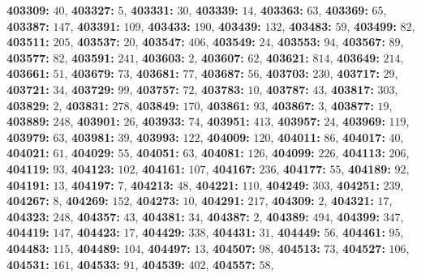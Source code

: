 \textsf{\bfseries 403309:} $40$, \textsf{\bfseries 403327:} $5$, \textsf{\bfseries 403331:} $30$, \textsf{\bfseries 403339:} $14$, \textsf{\bfseries 403363:} $63$, \textsf{\bfseries 403369:} $65$, \textsf{\bfseries 403387:} $147$, \textsf{\bfseries 403391:} $109$, \textsf{\bfseries 403433:} $190$, \textsf{\bfseries 403439:} $132$, \textsf{\bfseries 403483:} $59$, \textsf{\bfseries 403499:} $82$, \textsf{\bfseries 403511:} $205$, \textsf{\bfseries 403537:} $20$, \textsf{\bfseries 403547:} $406$, \textsf{\bfseries 403549:} $24$, \textsf{\bfseries 403553:} $94$, \textsf{\bfseries 403567:} $89$, \textsf{\bfseries 403577:} $82$, \textsf{\bfseries 403591:} $241$, \textsf{\bfseries 403603:} $2$, \textsf{\bfseries 403607:} $62$, \textsf{\bfseries 403621:} $814$, \textsf{\bfseries 403649:} $214$, \textsf{\bfseries 403661:} $51$, \textsf{\bfseries 403679:} $73$, \textsf{\bfseries 403681:} $77$, \textsf{\bfseries 403687:} $56$, \textsf{\bfseries 403703:} $230$, \textsf{\bfseries 403717:} $29$, \textsf{\bfseries 403721:} $34$, \textsf{\bfseries 403729:} $99$, \textsf{\bfseries 403757:} $72$, \textsf{\bfseries 403783:} $10$, \textsf{\bfseries 403787:} $43$, \textsf{\bfseries 403817:} $303$, \textsf{\bfseries 403829:} $2$, \textsf{\bfseries 403831:} $278$, \textsf{\bfseries 403849:} $170$, \textsf{\bfseries 403861:} $93$, \textsf{\bfseries 403867:} $3$, \textsf{\bfseries 403877:} $19$, \textsf{\bfseries 403889:} $248$, \textsf{\bfseries 403901:} $26$, \textsf{\bfseries 403933:} $74$, \textsf{\bfseries 403951:} $413$, \textsf{\bfseries 403957:} $24$, \textsf{\bfseries 403969:} $119$, \textsf{\bfseries 403979:} $63$, \textsf{\bfseries 403981:} $39$, \textsf{\bfseries 403993:} $122$, \textsf{\bfseries 404009:} $120$, \textsf{\bfseries 404011:} $86$, \textsf{\bfseries 404017:} $40$, \textsf{\bfseries 404021:} $61$, \textsf{\bfseries 404029:} $55$, \textsf{\bfseries 404051:} $63$, \textsf{\bfseries 404081:} $126$, \textsf{\bfseries 404099:} $226$, \textsf{\bfseries 404113:} $206$, \textsf{\bfseries 404119:} $93$, \textsf{\bfseries 404123:} $102$, \textsf{\bfseries 404161:} $107$, \textsf{\bfseries 404167:} $236$, \textsf{\bfseries 404177:} $55$, \textsf{\bfseries 404189:} $92$, \textsf{\bfseries 404191:} $13$, \textsf{\bfseries 404197:} $7$, \textsf{\bfseries 404213:} $48$, \textsf{\bfseries 404221:} $110$, \textsf{\bfseries 404249:} $303$, \textsf{\bfseries 404251:} $239$, \textsf{\bfseries 404267:} $8$, \textsf{\bfseries 404269:} $152$, \textsf{\bfseries 404273:} $10$, \textsf{\bfseries 404291:} $217$, \textsf{\bfseries 404309:} $2$, \textsf{\bfseries 404321:} $17$, \textsf{\bfseries 404323:} $248$, \textsf{\bfseries 404357:} $43$, \textsf{\bfseries 404381:} $34$, \textsf{\bfseries 404387:} $2$, \textsf{\bfseries 404389:} $494$, \textsf{\bfseries 404399:} $347$, \textsf{\bfseries 404419:} $147$, \textsf{\bfseries 404423:} $17$, \textsf{\bfseries 404429:} $338$, \textsf{\bfseries 404431:} $31$, \textsf{\bfseries 404449:} $56$, \textsf{\bfseries 404461:} $95$, \textsf{\bfseries 404483:} $115$, \textsf{\bfseries 404489:} $104$, \textsf{\bfseries 404497:} $13$, \textsf{\bfseries 404507:} $98$, \textsf{\bfseries 404513:} $73$, \textsf{\bfseries 404527:} $106$, \textsf{\bfseries 404531:} $161$, \textsf{\bfseries 404533:} $91$, \textsf{\bfseries 404539:} $402$, \textsf{\bfseries 404557:} $58$, 
